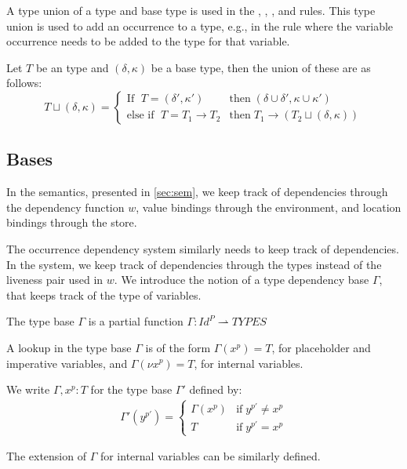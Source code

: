 \documentclass[../../master.tex]{subfiles}
\begin{document}
A type union of a type and base type is used in the , , , and  rules.
This type union is used to add an occurrence to a type, e.g., in the  rule where the variable occurrence needs to be added to the type for that variable.
\begin{definition}
	Let $T$ be an type and $(\delta,\kappa)$ be a base type, then the union of these are as follows:
	\begin{equation*}
		T\sqcup (\delta,\kappa)=
		\left\{\begin{matrix}
			\mbox{If } \; T=(\delta',\kappa')  & \mbox{then} \; (\delta\cup\delta',\kappa\cup\kappa')\\
			\mbox{else if } \; T=T_1\rightarrow T_2 & \mbox{then} \; T_1\rightarrow(T_2\sqcup (\delta,\kappa))
		\end{matrix}\right.
	\end{equation*}
\end{definition}

\subsection{Bases}
In the semantics, presented in \cref{sec:sem}, we keep track of dependencies through the dependency function $w$, value bindings through the environment, and location bindings through the store.

The occurrence dependency system similarly needs to keep track of dependencies.
In the system, we keep track of dependencies through the types instead of the liveness pair used in $w$.
We introduce the notion of a type dependency base $\Gamma$, that keeps track of the type of variables.

\begin{definition}
	The type base $\Gamma$ is a partial function $\Gamma:Id^P\rightharpoonup TYPES$
\end{definition}

A lookup in the type base $\Gamma$ is of the form $\Gamma(x^p)=T$, for placeholder and imperative variables, and $\Gamma(\nu x^p)=T$, for internal variables.

\begin{definition}
	We write $\Gamma,x^p:T$ for the type base $\Gamma'$ defined by:
	\begin{align*}
		\Gamma'(y^{p'})=
		\left\{\begin{matrix}
			\Gamma(x^p) & \mbox{if}\;y^{p'} \neq x^{p}\\ 
			T & \mbox{if}\;y^{p'} = x^{p}
		\end{matrix}\right.
	\end{align*}
\end{definition}
The extension of $\Gamma$ for internal variables can be similarly defined.
\bigskip
\end{document}
